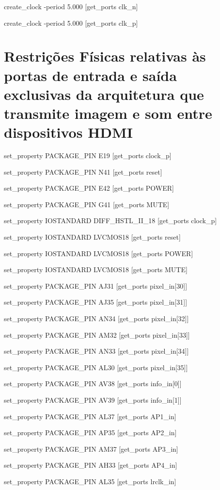 \small{
	
	create\_clock -period 5.000 [get\_ports clk\_n]
	
	create\_clock -period 5.000 [get\_ports clk\_p]}

\section{Restrições Físicas relativas às portas de entrada e saída exclusivas da arquitetura que transmite imagem e som entre dispositivos HDMI}\label{ap:fisicas_planC_especificas}

set\_property PACKAGE\_PIN E19 [get\_ports clock\_p]

set\_property PACKAGE\_PIN N41 [get\_ports reset]

set\_property PACKAGE\_PIN E42 [get\_ports POWER]

set\_property PACKAGE\_PIN G41 [get\_ports MUTE]

set\_property IOSTANDARD DIFF\_HSTL\_II\_18 [get\_ports clock\_p]

set\_property IOSTANDARD LVCMOS18 [get\_ports reset]

set\_property IOSTANDARD LVCMOS18 [get\_ports POWER]

set\_property IOSTANDARD LVCMOS18 [get\_ports MUTE]

set\_property PACKAGE\_PIN AJ31 [get\_ports {pixel\_in[30]}]

set\_property PACKAGE\_PIN AJ35 [get\_ports {pixel\_in[31]}]

set\_property PACKAGE\_PIN AN34 [get\_ports {pixel\_in[32]}]

set\_property PACKAGE\_PIN AM32 [get\_ports {pixel\_in[33]}]

set\_property PACKAGE\_PIN AN33 [get\_ports {pixel\_in[34]}]

set\_property PACKAGE\_PIN AL30 [get\_ports {pixel\_in[35]}]

set\_property PACKAGE\_PIN AV38 [get\_ports {info\_in[0]}]

set\_property PACKAGE\_PIN AV39 [get\_ports {info\_in[1]}]

set\_property PACKAGE\_PIN AL37 [get\_ports AP1\_in]

set\_property PACKAGE\_PIN AP35 [get\_ports AP2\_in]

set\_property PACKAGE\_PIN AM37 [get\_ports AP3\_in]

set\_property PACKAGE\_PIN AH33 [get\_ports AP4\_in]

set\_property PACKAGE\_PIN AL35 [get\_ports lrclk\_in]

